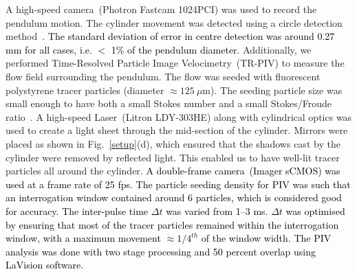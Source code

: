 \documentclass{jfm}
\begin{document}
A high-speed camera~(Photron Fastcam 1024PCI) was used to record the pendulum motion. The cylinder movement was detected using a circle detection method~\citep{mathai2015wake}. \textcolor{black}{The standard deviation of error in centre detection was around 0.27 mm for all cases, i.e. $<$ 1\% of the pendulum diameter.} Additionally, we performed Time-Resolved Particle Image Velocimetry~(TR-PIV) to measure the flow field surrounding the pendulum. The flow was seeded with fluorescent polystyrene tracer particles (diameter $\approx 125 \ \mu$m). The seeding particle size was small enough to have both a small Stokes number and a small Stokes/Froude ratio~\citep{mathai2016microbubbles}. A high-speed Laser~(Litron LDY-303HE) along with cylindrical optics was used to create a light sheet through the mid-section of the cylinder. Mirrors were placed as shown in Fig.~\ref{setup}(d), which ensured that the shadows cast by the cylinder were removed by reflected light. This enabled us to have well-lit tracer particles all around the cylinder. \textcolor{black}{A double-frame camera~(Imager sCMOS) was used at a frame rate of 25 fps. The particle seeding density for PIV was such that an interrogation window contained around 6 particles, which is considered good for accuracy. The inter-pulse time $\Delta t$ was varied from 1--3 ms. $\Delta t$ was optimised by ensuring that most of the tracer particles remained within the interrogation window, with a maximum movement $\approx 1/4^{th}$ of the window width. The PIV analysis was done with two stage processing and 50 percent overlap using LaVision software.} 
%
\end{document}
